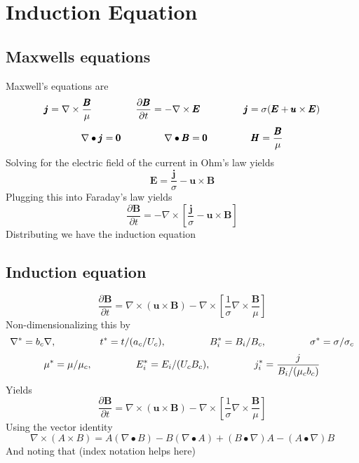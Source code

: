 \section{Induction Equation}
\subsection{Maxwells equations}
Maxwell's equations are
\begin{equation}
\pmb{j} = \nabla \times \frac{\pmb{B}}{\mu}
\;\;\;\;\;\;\;\;\;\;\;\;\;\;\;\;
\frac{\partial \pmb{B}}{\partial t} = 
- \nabla \times \pmb{E}
\;\;\;\;\;\;\;\;\;\;\;\;\;\;\;\;
\pmb{j} = \sigma (\pmb{E} + \pmb{u}\times \pmb{E})
\end{equation}
\begin{equation}
\nabla \bullet \pmb{j} = \pmb{0}
\;\;\;\;\;\;\;\;\;\;\;\;\;\;\;\;
\nabla \bullet \pmb{B} = \pmb{0}
\;\;\;\;\;\;\;\;\;\;\;\;\;\;\;\;
\pmb{H} = \frac{\pmb{B}}{\mu}
\end{equation}
Solving for the electric field of the current in Ohm's law yields
\begin{equation}
\pmb{E} = \frac{\pmb{j}}{\sigma} - \pmb{u} \times \pmb{B}
\end{equation}
Plugging this into Faraday's law yields
\begin{equation}
\frac{\partial \pmb{B}}{\partial t} = 
- \nabla \times \left[ \frac{\pmb{j}}{\sigma}
- \pmb{u} \times \pmb{B} \right]
\end{equation}
Distributing we have the induction equation
\subsection{Induction equation}
\begin{equation}
\frac{\partial \pmb{B}}{\partial t} = 
\nabla \times (\pmb{u} \times \pmb{B})
- \nabla \times 
\left[ \frac{1}{\sigma}
\nabla \times \frac{\pmb{B}}{\mu} \right]
\end{equation}
Non-dimensionalizing this by
\begin{equation*}
\nabla^* = b_c \nabla ,\;\;\;\;\;\;\;\;\;\;\;\;\;\;\;\;
t^* = t/(a_c/U_c) ,\;\;\;\;\;\;\;\;\;\;\;\;\;\;\;\;
B_i^* = B_i/B_c  ,\;\;\;\;\;\;\;\;\;\;\;\;\;\;\;\;
\sigma^* = \sigma/\sigma_c
\end{equation*}
\begin{equation*}
\mu^* = \mu/\mu_c ,\;\;\;\;\;\;\;\;\;\;\;\;\;\;\;\;
E_i^* = E_i/(U_c B_c) ,\;\;\;\;\;\;\;\;\;\;\;\;\;\;\;\;
j_i^* = \frac{j}{B_i/(\mu_c b_c)}
\end{equation*}
Yields
\begin{equation}
\frac{\partial \pmb{B}}{\partial t} = 
\nabla \times (\pmb{u} \times \pmb{B})
- \nabla \times 
\left[ \frac{1}{\sigma}
\nabla \times \frac{\pmb{B}}{\mu} \right]
\end{equation}
Using the vector identity
\begin{equation}
\nabla \times (A\times B) = 
A(\nabla \bullet B) 
- B(\nabla \bullet A)
+(B \bullet \nabla)A - (A \bullet \nabla)B
\end{equation}
And noting that (index notation helps here)

